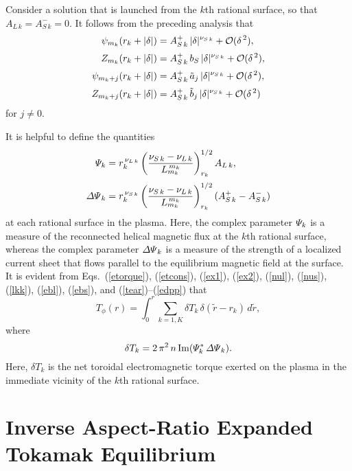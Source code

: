 \documentclass[12pt,prb,aps]{revtex4-1}
\begin{document}
Consider a solution that is launched from the $k$th rational surface, so that $A_{L\,k} = A_{S\,k}^-=0$. It follows from the preceding analysis that
\begin{align}
\psi_{m_k}(r_k+|\delta|) &= A_{S\,k}^+\,|\delta|^{\nu_{S\,k}}+ {\cal O}(\delta^{\,2}),\\[0.5ex]
Z_{m_k}(r_k+|\delta|) &= A_{S\,k}^+\,b_S\,|\delta|^{\nu_{S\,k}}+ {\cal O}(\delta^{\,2}),\\[0.5ex]
\psi_{m_k+j}(r_k+|\delta|)& = A_{S\,k}^+\,\tilde{a}_j\,|\delta|^{\nu_{S\,k}}+ {\cal O}(\delta^{\,2}),\\[0.5ex]
Z_{m_k+j}(r_k+|\delta|) &= A_{S\,k}^+\,\tilde{b}_j\,|\delta|^{\nu_{S\,k}}+ {\cal O}(\delta^{\,2})
\end{align}
for $j\neq 0$. 

It is helpful to define the quantities\,\cite{am1}
\begin{align}\label{Psidef}
{\mit\Psi}_k&= r_k^{\,\nu_{L\,k}}\left(\frac{\nu_{S\,k}-\nu_{L\,k}}{L_{m_k}^{\,{m_k}}}\right)^{1/2}_{r_k} A_{L\,k},\\[0.5ex]
{\mit\Delta\Psi}_k &= r_k^{\,\nu_{S\,k}}\left(\frac{\nu_{S\,k}-\nu_{L\,k}}{L_{m_k}^{\,m_k}}\right)^{1/2}_{r_k} (A_{S\,k}^+ - A_{S\,k}^-)\label{edpp}
\end{align}
at each rational surface in the plasma. Here, the complex parameter ${\mit\Psi}_k$ is a measure of the reconnected helical magnetic flux at the $k$th rational surface, whereas
the complex parameter ${\mit\Delta\Psi}_k$ is a measure of the strength of a localized current sheet that flows parallel to the equilibrium magnetic field at the surface. 
It is evident from Eqs.~(\ref{etorque}), (\ref{etcons}), (\ref{ex1}), (\ref{ex2}), (\ref{nul}), (\ref{nus}), (\ref{lkk}), (\ref{ebl}), (\ref{ebs}), and (\ref{tear})--(\ref{edpp}) that\, \cite{am1,am3}
\begin{equation}\label{e204z}
T_\phi(r) =\int_0^r \sum_{k=1,K}\delta T_k\,\delta(\tilde{r}-r_k)\,d\tilde{r},
\end{equation}
where
\begin{equation}\label{e194t}
\delta T_k = 2\,\pi^2\,n\,{\rm Im}({\mit\Psi}_k^\ast\,{\mit\Delta\Psi}_k).
\end{equation}
Here, $\delta T_k$ is the net toroidal electromagnetic torque exerted on the plasma in the immediate vicinity of the $k$th rational
surface. 

\section{Inverse Aspect-Ratio Expanded Tokamak Equilibrium}
\end{document}
